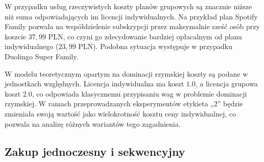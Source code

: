 W przypadku usług rzeczywistych koszty planów grupowych są znacznie niższe niż suma odpowiadających im licencji indywidualnych. Na przykład plan Spotify Family pozwala na współdzielenie subskrypcji przez maksymalnie sześć osób przy koszcie $37{,}99$ PLN, co czyni go zdecydowanie bardziej opłacalnym od planu indywidualnego ($23{,}99$ PLN). Podobna sytuacja występuje w przypadku Duolingo Super Family.  

W modelu teoretycznym opartym na dominacji rzymskiej koszty są podane w jednostkach względnych. Licencja indywidualna ma koszt $1.0$, a licencja grupowa koszt $2.0$, co odpowiada klasycznemu przypisaniu wag w problemie dominacji rzymskiej. W ramach przeprowadzanych eksperymentów etykieta „2” będzie zmieniała swoją wartość jako wielokrotność kosztu ceny indywidualnej, co pozwala na analizę różnych wariantów tego zagadnienia.






\subsection{Zakup jednoczesny i sekwencyjny}

